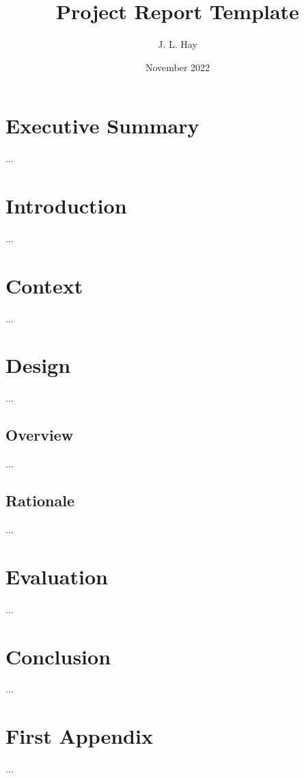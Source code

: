 \documentclass{article}
\title{Project Report Template}
\author{J. L. Hay \cite{hay22}}
\date{November 2022}
\begin{document}
\thispagestyle{empty}

\maketitle

\pagebreak



\section*{Executive Summary}
...

\pagebreak


\tableofcontents

\pagebreak


\fancyfoot[R]{\thepage/\pageref*{page:final}}

\section{Introduction}
...

\pagebreak


\section{Context}
...

\pagebreak


\section{Design}
...

\subsection{Overview}
...

\subsection{Rationale}
... 

\pagebreak


\section{Evaluation}
...

\pagebreak


\section*{Conclusion}
\label{page:final}
...

\pagebreak


\fancyfoot[R]{\thepage}

\printbibliography
{}

\pagebreak
\appendix

\section{First Appendix}
...
\end{document}
